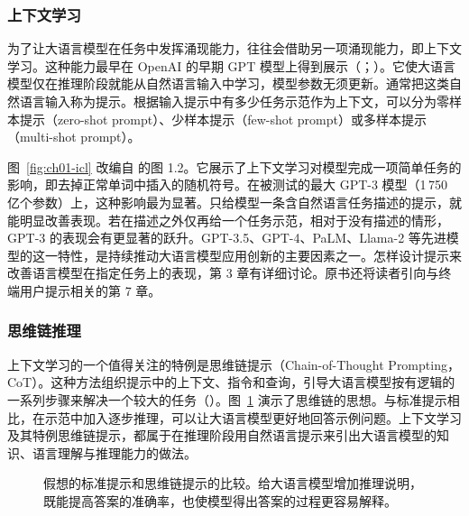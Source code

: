 \subsubsection{上下文学习}
\label{sec:ch01-icl}
为了让大语言模型在任务中发挥涌现能力，往往会借助另一项涌现能力，即上下文学习。这种能力最早在 OpenAI 的早期 GPT 模型上得到展示（；）。它使大语言模型仅在推理阶段就能从自然语言输入中学习，模型参数无须更新。通常把这类自然语言输入称为提示。根据输入提示中有多少任务示范作为上下文，可以分为零样本提示（zero-shot prompt）、少样本提示（few-shot prompt）或多样本提示（multi-shot prompt）。


图~\ref{fig:ch01-icl} 改编自 的图 1.2。它展示了上下文学习对模型完成一项简单任务的影响，即去掉正常单词中插入的随机符号。在被测试的最大 GPT-3 模型（1\,750 亿个参数）上，这种影响最为显著。只给模型一条含自然语言任务描述的提示，就能明显改善表现。若在描述之外仅再给一个任务示范，相对于没有描述的情形，GPT-3 的表现会有更显著的跃升。GPT-3.5、GPT-4、PaLM、Llama-2 等先进模型的这一特性，是持续推动大语言模型应用创新的主要因素之一。怎样设计提示来改善语言模型在指定任务上的表现，第 3 章有详细讨论。原书还将读者引向与终端用户提示相关的第 7 章。

\subsubsection{思维链推理}
上下文学习的一个值得关注的特例是思维链提示（Chain-of-Thought Prompting，CoT）。这种方法组织提示中的上下文、指令和查询，引导大语言模型按有逻辑的一系列步骤来解决一个较大的任务（）。图~\ref{fig:ch01-cot} 演示了思维链的思想。与标准提示相比，在示范中加入逐步推理，可以让大语言模型更好地回答示例问题。上下文学习及其特例思维链提示，都属于在推理阶段用自然语言提示来引出大语言模型的知识、语言理解与推理能力的做法。

\begin{figure}[!htbp]
\centering

\caption{假想的标准提示和思维链提示的比较。给大语言模型增加推理说明，既能提高答案的准确率，也使模型得出答案的过程更容易解释。}
\label{fig:ch01-cot}
\end{figure}

